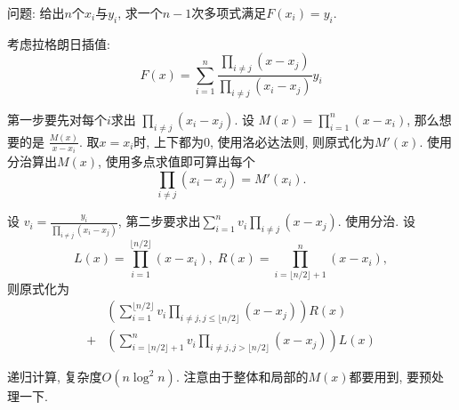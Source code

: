 问题: 给出$n$个$x_i$与$y_i$, 求一个$n-1$次多项式满足$F(x_i)=y_i$.

考虑拉格朗日插值: 
$$F(x)=\sum_{i=1}^n\frac{\prod_{i\neq j}(x-x_j)}{\prod_{i\neq j}(x_i-x_j)}y_i$$

第一步要先对每个$i$求出 $\prod_{i\neq j}(x_i-x_j)$. 设 $M(x)=\prod_{i=1}^{n}(x-x_i)$, 那么想要的是 $\frac{M(x)}{x-x_i}$.  取$x=x_i$时, 上下都为0, 使用洛必达法则, 则原式化为$M'(x)$.  使用分治算出$M(x)$, 使用多点求值即可算出每个
$$\prod_{i\neq j}(x_i-x_j)=M'(x_i).$$

设 $v_i = \frac{y_i}{\prod_{i\neq j}(x_i-x_j)}$, 第二步要求出$\sum_{i=1}^{n}v_i\prod_{i\neq j}(x-x_j)$. 使用分治. 设
$$L(x)=\prod_{i=1}^{\lfloor n/2\rfloor}(x-x_i), \; R(x)=\prod_{i=\lfloor n/2\rfloor+1}^n(x-x_i),$$
则原式化为
\begin{align*}
	&\left( \sum_{i=1}^{\lfloor n/2\rfloor}v_i\prod_{i\neq j,j\leq\lfloor n/2\rfloor}(x-x_j)\right)R(x) \\
	+& \left( \sum_{i=\lfloor n/2\rfloor+1}^{n}v_i\prod_{i\neq j,j>\lfloor n/2\rfloor}(x-x_j)\right)L(x)
\end{align*}

递归计算, 复杂度$O(n\log^2n)$. 注意由于整体和局部的$M(x)$都要用到, 要预处理一下.

\inputminted{cpp}{src/Math/快速插值.cpp}